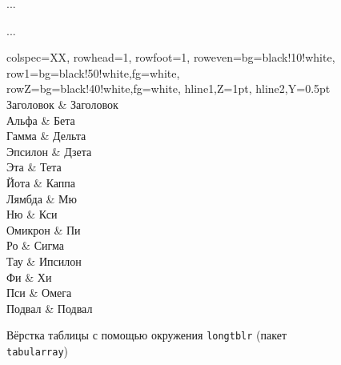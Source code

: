 \documentclass[a4paper,12pt,hyphens]{article}
\newcommand\package[1]{\texttt{#1}}
\begin{document}
\begin{figure}[tp]
\begin{latexcode}
...
\usepackage{tabularray}
%
%
...
\begin{longtblr}[
  label={table1},
  caption={Пример},
  remark{Примечание}={Таблица не помещается на страницу.}
]{
  colspec={XX},
  rowhead=1,
  rowfoot=1,
  row{even}={bg=black!10!white},
  row{1}={bg=black!50!white,fg=white},
  row{Z}={bg=black!40!white,fg=white},
  hline{1,Z}={1pt},
  hline{2,Y}={0.5pt}
}
Заголовок & Заголовок \\
Альфа     & Бета      \\
Гамма     & Дельта    \\
Эпсилон   & Дзета     \\
Эта       & Тета      \\
Йота      & Каппа     \\
Лямбда    & Мю        \\
Ню        & Кси       \\
Омикрон   & Пи        \\
Ро        & Сигма     \\
Тау       & Ипсилон   \\
Фи        & Хи        \\
Пси       & Омега     \\
Подвал    & Подвал    \\
\end{longtblr}
\end{latexcode}
\caption{Вёрстка таблицы с помощью окружения \package{longtblr} (пакет \package{tabularray})}\label{tabularray3}
\end{figure}%
\end{document}
